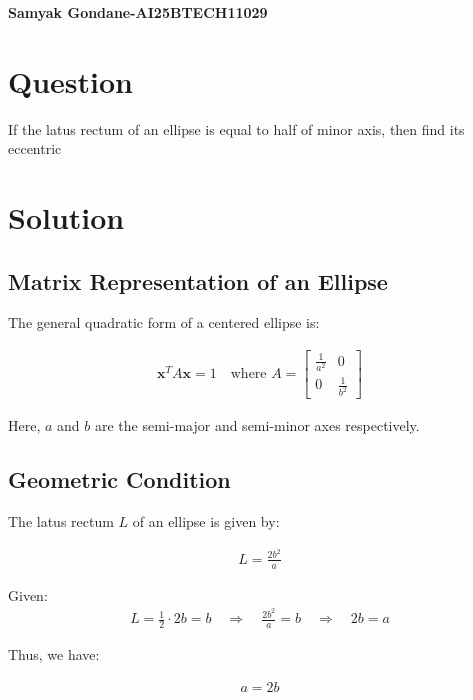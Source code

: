 \documentclass{article}
\begin{document}
\begin{center}
\large
    \textbf{Samyak Gondane-AI25BTECH11029}
\end{center}
\date{}

\section*{Question}
If the latus rectum of an ellipse is equal to half of minor axis, then find its eccentric

\section*{Solution}


\subsection*{Matrix Representation of an Ellipse}

The general quadratic form of a centered ellipse is:


\begin{align}
\mathbf{x}^T A \mathbf{x} = 1
\quad \text{where } A = 
\begin{bmatrix}
\frac{1}{a^2} & 0 \\
0 & \frac{1}{b^2}
\end{bmatrix}
\end{align}



Here, $a$ and $b$ are the semi-major and semi-minor axes respectively.

\subsection*{Geometric Condition}

The latus rectum $L$ of an ellipse is given by:


\begin{align}
L = \frac{2b^2}{a}
\end{align}



Given:
\begin{align}
L = \frac{1}{2} \cdot 2b = b
\quad \Rightarrow \quad \frac{2b^2}{a} = b
\quad \Rightarrow \quad 2b = a
\end{align}

Thus, we have:

\begin{align}
a = 2b
\end{align}
\end{document}
